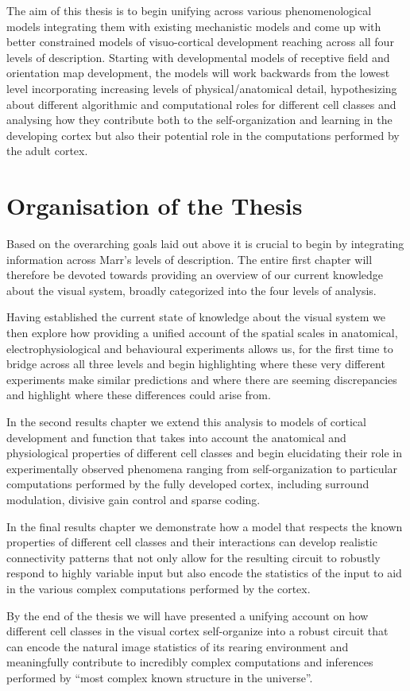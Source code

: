 The aim of this thesis is to begin unifying across various
phenomenological models integrating them with existing mechanistic
models and come up with better constrained models of visuo-cortical
development reaching across all four levels of description. Starting
with developmental models of receptive field and orientation map
development, the models will work backwards from the lowest level
incorporating increasing levels of physical/anatomical detail,
hypothesizing about different algorithmic and computational roles for
different cell classes and analysing how they contribute both to the
self-organization and learning in the developing cortex but also their
potential role in the computations performed by the adult cortex.

\section{Organisation of the Thesis}

Based on the overarching goals laid out above it is crucial to begin
by integrating information across Marr's levels of description. The
entire first chapter will therefore be devoted towards providing an
overview of our current knowledge about the visual system, broadly
categorized into the four levels of analysis.

Having established the current state of knowledge about the visual
system we then explore how providing a unified account of the spatial
scales in anatomical, electrophysiological and behavioural experiments
allows us, for the first time to bridge across all three levels and
begin highlighting where these very different experiments make similar
predictions and where there are seeming discrepancies and highlight
where these differences could arise from.

In the second results chapter we extend this analysis to models of
cortical development and function that takes into account the
anatomical and physiological properties of different cell classes and
begin elucidating their role in experimentally observed phenomena
ranging from self-organization to particular computations performed by
the fully developed cortex, including surround modulation, divisive
gain control and sparse coding.

In the final results chapter we demonstrate how a model that respects
the known properties of different cell classes and their interactions
can develop realistic connectivity patterns that not only allow for
the resulting circuit to robustly respond to highly variable input but
also encode the statistics of the input to aid in the various complex
computations performed by the cortex.

By the end of the thesis we will have presented a unifying account on
how different cell classes in the visual cortex self-organize into a
robust circuit that can encode the natural image statistics of its
rearing environment and meaningfully contribute to incredibly complex
computations and inferences performed by ``most complex known
structure in the universe''.
